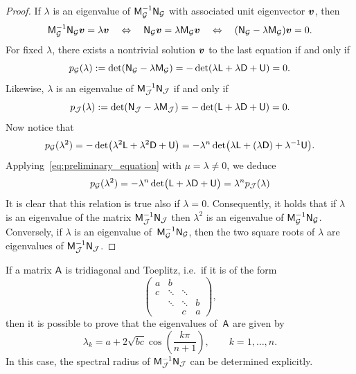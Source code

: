 \begin{proof}
    If $\lambda$ is an eigenvalue of $\mathsf M_{\mathcal G}^{-1} \mathsf N_{\mathcal G}$ with associated unit eigenvector $\mathbf{\boldsymbol{v}}$,
    then
    \[
        \mathsf M_{\mathcal G}^{-1} \mathsf N_{\mathcal G} \mathbf{\boldsymbol{v}} = \lambda \mathbf{\boldsymbol{v}}
        \quad \Leftrightarrow \quad
        \mathsf N_{\mathcal G} \mathbf{\boldsymbol{v}} = \lambda \mathsf M_{\mathcal G} \mathbf{\boldsymbol{v}}
        \quad \Leftrightarrow \quad
        (\mathsf N_{\mathcal G} - \lambda \mathsf M_{\mathcal G}) \mathbf{\boldsymbol{v}} = 0.
    \]
    For fixed $\lambda$,
    there exists a nontrivial solution $\mathbf{\boldsymbol{v}}$ to the last equation if and only if
    \[
        p_{\mathcal G}(\lambda) := \det (\mathsf N_{\mathcal G} - \lambda \mathsf M_{\mathcal G})
        = - \det (\lambda \mathsf L + \lambda \mathsf D + \mathsf U) = 0.
    \]
    Likewise, $\lambda$ is an eigenvalue of $\mathsf M_{\mathcal J}^{-1} \mathsf N_{\mathcal J}$ if and only if
    \[
        p_{\mathcal J}(\lambda) := \det (\mathsf N_{\mathcal J} - \lambda \mathsf M_{\mathcal J})
        = - \det (\mathsf L + \lambda \mathsf D + \mathsf U) = 0.
    \]
    Now notice that
    \[
        p_{\mathcal G}(\lambda^2)
        = - \det \bigl(\lambda^2 \mathsf L + \lambda^2 \mathsf D + \mathsf U\bigr)
        = - \lambda^n \det \bigl(\lambda \mathsf L + (\lambda \mathsf D) + \lambda^{-1} \mathsf U\bigr).
    \]
    Applying~\eqref{eq:preliminary_equation} with $\mu = \lambda \neq 0$,
    we deduce
    \[
        p_{\mathcal G}(\lambda^2)
        = - \lambda^n \det \bigl(\mathsf L + \lambda \mathsf D + \mathsf U\bigr)
        = \lambda^n p_{\mathcal J}(\lambda)
    \]
    It is clear that this relation is true also if $\lambda = 0$.
    Consequently, it holds that if $\lambda$ is an eigenvalue of the matrix $\mathsf M_{\mathcal J}^{-1} \mathsf N_{\mathcal J}$ then
    $\lambda^2$ is an eigenvalue of $\mathsf M_{\mathcal G}^{-1} \mathsf N_{\mathcal G}$.
    Conversely, if $\lambda$ is an eigenvalue of~$\mathsf M_{\mathcal G}^{-1} \mathsf N_{\mathcal G}$,
    then the two square roots of $\lambda$ are eigenvalues of $\mathsf M_{\mathcal J}^{-1} \mathsf N_{\mathcal J}$.
\end{proof}

If a matrix $\mathsf A$ is tridiagonal and Toeplitz,
i.e.\ if it is of the form
\[
    \begin{pmatrix}
        a & b \\
        c & \ddots & \ddots  \\
             & \ddots & \ddots & b \\
             & & c & a
    \end{pmatrix},
\]
then it is possible to prove that the eigenvalues of~$\mathsf A$ are given by
\[
    \lambda_k =
    a + 2\sqrt{bc} \cos \left(\frac{k \pi}{n+1} \right),
    \qquad k = 1, \dots, n.
\]
In this case, the spectral radius of $\mathsf M_{\mathcal J}^{-1} \mathsf N_{\mathcal J}$ can be determined explicitly.

